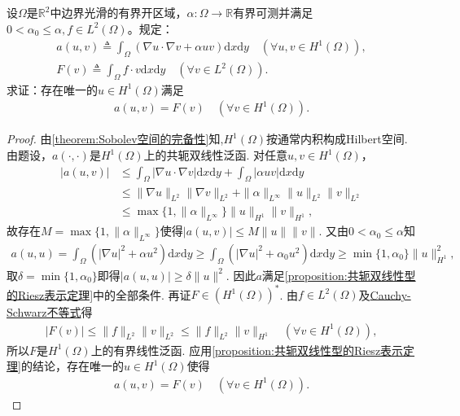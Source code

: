 \documentclass[../../main.tex]{subfiles}%
\begin{document}
\begin{example}
设$\Omega$是$\mathbb{R}^2$中边界光滑的有界开区域，$\alpha:\Omega\to\mathbb{R}$有界可测并满足$0<\alpha_0\leqslant\alpha,f\in L^2(\Omega)$。规定：
\begin{gather*}
a(u,v)\triangleq\int_{\Omega}(\nabla u\cdot\nabla v+\alpha uv)\mathrm{d}x\mathrm{d}y\quad (\forall u,v\in H^1(\Omega)),\\
F(v)\triangleq\int_{\Omega}f\cdot v\mathrm{d}x\mathrm{d}y\quad (\forall v\in L^2(\Omega)).
\end{gather*}
求证：存在唯一的$u\in H^1(\Omega)$满足
\begin{align*}
a(u,v)=F(v)\quad (\forall v\in H^1(\Omega)).
\end{align*}
\end{example}
\begin{proof}
由\cref{theorem:Sobolev空间的完备性}知,$H^1(\Omega)$按通常内积构成Hilbert空间. 由题设，$a(\cdot,\cdot)$是$H^1(\Omega)$上的共轭双线性泛函. 对任意$u,v\in H^1(\Omega)$，
\begin{align*}
|a(u,v)| &\leqslant \int_{\Omega}|\nabla u\cdot\nabla v|\mathrm{d}x\mathrm{d}y+\int_{\Omega}|\alpha uv|\mathrm{d}x\mathrm{d}y\\
&\leqslant \|\nabla u\|_{L^2}\|\nabla v\|_{L^2}+\|\alpha\|_{L^\infty}\|u\|_{L^2}\|v\|_{L^2}\\
&\leqslant \max\{1,\|\alpha\|_{L^\infty}\}\|u\|_{H^1}\|v\|_{H^1},
\end{align*}
故存在$M=\max\{1,\|\alpha\|_{L^\infty}\}$使得$|a(u,v)|\leqslant M\|u\|\|v\|$. 又由$0<\alpha_0\leqslant\alpha$知
\begin{align*}
a(u,u)=\int_{\Omega}(|\nabla u|^2+\alpha u^2)\mathrm{d}x\mathrm{d}y\geqslant \int_{\Omega}(|\nabla u|^2+\alpha_0 u^2)\mathrm{d}x\mathrm{d}y\geqslant \min\{1,\alpha_0\}\|u\|_{H^1}^2,
\end{align*}
取$\delta=\min\{1,\alpha_0\}$即得$|a(u,u)|\geqslant\delta\|u\|^2$. 因此$a$满足\cref{proposition:共轭双线性型的Riesz表示定理}中的全部条件. 再证$F\in (H^1(\Omega))^*$. 由$f\in L^2(\Omega)$及\hyperref[theorem:泛函分析--Cauchy-Schwarz不等式]{Cauchy-Schwarz不等式}得
\begin{align*}
|F(v)|\leqslant \|f\|_{L^2}\|v\|_{L^2}\leqslant \|f\|_{L^2}\|v\|_{H^1}\quad (\forall v\in H^1(\Omega)),
\end{align*}
所以$F$是$H^1(\Omega)$上的有界线性泛函. 应用\cref{proposition:共轭双线性型的Riesz表示定理}的结论，存在唯一的$u\in H^1(\Omega)$使得
\begin{align*}
a(u,v)=F(v)\quad (\forall v\in H^1(\Omega)).
\end{align*}
\end{proof}
\end{document}
